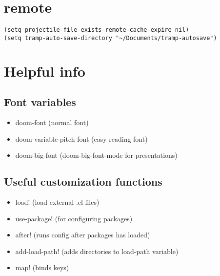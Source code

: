 \documentclass[11pt]{article}
\begin{document}
\section{remote}
\label{sec:org451407a}
\begin{verbatim}
(setq projectile-file-exists-remote-cache-expire nil)
(setq tramp-auto-save-directory "~/Documents/tramp-autosave")
\end{verbatim}

\section{Helpful info}
\label{sec:org5792439}
\subsection{Font variables}
\label{sec:org052282a}
\begin{itemize}
\item doom-font (normal font)
\item doom-variable-pitch-font (easy reading font)
\item doom-big-font (doom-big-font-mode for presentations)
\end{itemize}
\subsection{Useful customization functions}
\label{sec:orgc9f7608}
\begin{itemize}
\item load! (load external .el files)
\item use-package! (for configuring packages)
\item after! (runs config after packages has loaded)
\item add-load-path! (adds directories to load-path variable)
\item map! (binds keys)
\end{itemize}
\end{document}
